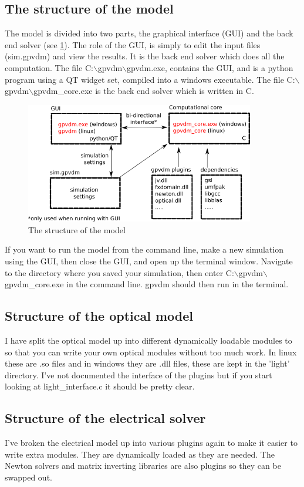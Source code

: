 \documentclass[11pt]{article}
\begin{document}
\subsection{The structure of the model}
The model is divided into two parts, the graphical interface (GUI) and the back end solver (see \ref{fig:structureofthemodel}).  The role of the GUI, is simply to edit the input files (sim.gpvdm) and view the results.  It is the back end solver which does all the computation.  The file C:$\backslash$gpvdm$\backslash$gpvdm.exe, contains the GUI, and is a python program using a QT widget set, compiled into a windows executable.  The file C:$\backslash$gpvdm$\backslash$gpvdm\_core.exe is the back end solver which is written in C.
\begin{figure}
\centering
\includegraphics[width=100mm]{./images/architecture.png}
\caption{The structure of the model}
\label{fig:structureofthemodel}
\end{figure}
If you want to run the model from the command line, make a new simulation using the GUI, then close the GUI, and open up the terminal window.  Navigate to the directory where you saved your simulation, then enter C:$\backslash$gpvdm$\backslash$gpvdm\_core.exe in the command line.  gpvdm should then run in the terminal.

\subsection{Structure of the optical model}
I have split the optical model up into different dynamically loadable modules to so that you can write your own optical modules without too much work.  In linux these are .so files and in windows they are .dll files, these are kept in the 'light' directory.  I've not documented the interface of the plugins but if you start looking at light\_interface.c it should be pretty clear.

\subsection{Structure of the electrical solver}
I've broken the electrical model up into various plugins again to make it easier to write extra modules.  They are dynamically loaded as they are needed.  The Newton solvers and matrix inverting libraries are also plugins so they can be swapped out.
\end{document}
